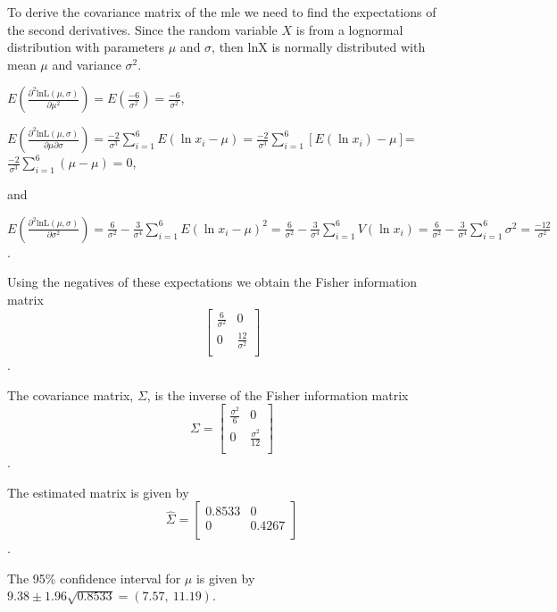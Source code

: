 \documentclass[]{book}
\theoremstyle{definition}
\theoremstyle{definition}
\theoremstyle{definition}
\theoremstyle{remark}
\begin{document}
To derive the covariance matrix of the mle we need to find the
expectations of the second derivatives. Since the random variable \(X\)
is from a lognormal distribution with parameters \(\mu\) and \(\sigma\),
then \(\text{lnX}\) is normally distributed with mean \(\mu\) and
variance \(\sigma^{2}\).

\(E\left( \frac{\partial^{2}\text{lnL}\left( \mu,\sigma \right)}{\partial\mu^{2}} \right) = E\left( \frac{- 6}{\sigma^{2}} \right) = \frac{- 6}{\sigma^{2}}\),

\(E\left( \frac{\partial^{2}\text{lnL}\left( \mu,\sigma \right)}{\partial\mu\partial\sigma} \right) = \frac{- 2}{\sigma^{3}}\sum_{i = 1}^{6}{E\left( \ln x_{i} - \mu \right)} = \frac{- 2}{\sigma^{3}}\sum_{i = 1}^{6}\left\lbrack E\left( \ln x_{i} \right) - \mu \right\rbrack\)=\(\frac{- 2}{\sigma^{3}}\sum_{i = 1}^{6}\left( \mu - \mu \right) = 0\),

and

\(E\left( \frac{\partial^{2}\text{lnL}\left( \mu,\sigma \right)}{\partial\sigma^{2}} \right) = \frac{6}{\sigma^{2}} - \frac{3}{\sigma^{4}}\sum_{i = 1}^{6}{E\left( \ln x_{i} - \mu \right)}^{2} = \frac{6}{\sigma^{2}} - \frac{3}{\sigma^{4}}\sum_{i = 1}^{6}{V\left( \ln x_{i} \right) = \frac{6}{\sigma^{2}} - \frac{3}{\sigma^{4}}\sum_{i = 1}^{6}{\sigma^{2} = \frac{- 12}{\sigma^{2}}}}\).

Using the negatives of these expectations we obtain the Fisher
information matrix \[\begin{bmatrix}
\frac{6}{\sigma^{2}} & 0 \\
0 & \frac{12}{\sigma^{2}} \\
\end{bmatrix}\].

The covariance matrix, \(\Sigma\), is the inverse of the Fisher
information matrix \[\Sigma = \begin{bmatrix}
\frac{\sigma^{2}}{6} & 0 \\
0 & \frac{\sigma^{2}}{12} \\
\end{bmatrix}\].

The estimated matrix is given by \[\hat{\Sigma} = \begin{bmatrix}
0.8533 & 0 \\
0 & 0.4267 \\
\end{bmatrix}\].

The 95\% confidence interval for \(\mu\) is given by
\(9.38 \pm 1.96\sqrt{0.8533} = \left( 7.57,\ 11.19 \right)\).
\end{document}

